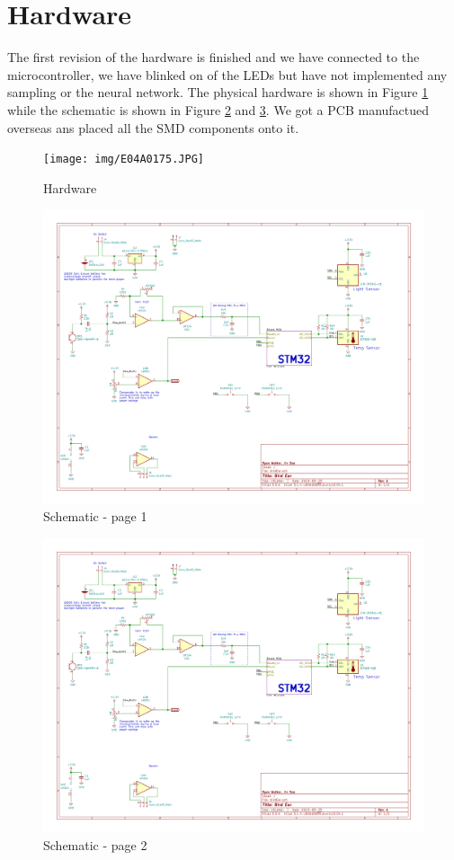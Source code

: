 \documentclass{article}
\begin{document}
\section{Hardware}
The first revision of the hardware is finished and we have connected to the microcontroller, we have blinked on of the LEDs but have not implemented any sampling or the neural network. The physical hardware is shown in Figure \ref{hardware} while the schematic is shown in Figure \ref{sch1} and \ref{sch2}. We got a PCB manufactued overseas ans placed all the SMD components onto it.
 
\begin{figure}[H]
\centering
\texttt{[image: img/E04A0175.JPG]}
\caption{Hardware}
\label{hardware}
\end{figure}

\begin{figure}[H]
\centering
\includegraphics[scale=0.7, angle=90, page=1]{../birdEar/plot/birdEar.pdf}
\caption{Schematic - page 1}
\label{sch1}
\end{figure}

\begin{figure}[H]
\centering
\includegraphics[scale=0.7, angle=90, page=2]{../birdEar/plot/birdEar.pdf}
\caption{Schematic - page 2}
\label{sch2}
\end{figure}
\end{document}
